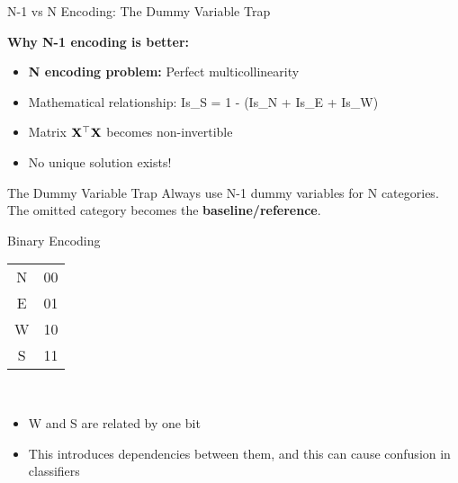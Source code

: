 \documentclass{beamer}
\begin{document}
    
    
    \begin{frame}{N-1 vs N Encoding: The Dummy Variable Trap}
    
    \textbf{Why N-1 encoding is better:}
    \begin{itemize}[<+->]
        \item \textbf{N encoding problem:} Perfect multicollinearity
        \item Mathematical relationship: Is\_S = 1 - (Is\_N + Is\_E + Is\_W)
        \item Matrix $\mathbf{X}^\top\mathbf{X}$ becomes non-invertible
        \item No unique solution exists!
    \end{itemize}
    
    \pause
    \begin{examplebox}{The Dummy Variable Trap}
    Always use N-1 dummy variables for N categories.
    \\ The omitted category becomes the \textbf{baseline/reference}.
    \end{examplebox}
    \end{frame}
    
    
    \begin{frame}{Binary Encoding}
    
    \begin{center}
    \begin{tabular}{|c|c|}
    \hline
    N & 00 \\
    E& 01\\
    W & 10\\
    S& 11\\
    \hline
    \end{tabular}\\
    \end{center}
    
    
    \vspace{1em}
    \begin{itemize}[<+->]
        \item W and S are related by one bit
        \item This introduces dependencies between them, and this can cause confusion in classifiers
    \end{itemize}
    \end{frame}
    
\end{document}
